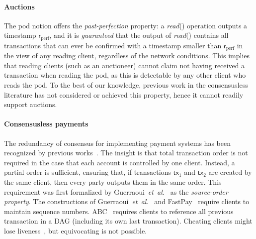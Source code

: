 \documentclass[pdflatex,sn-mathphys-num]{sn-jnl}%
\makeatletter
\theoremstyle{thmstyleone}%
\theoremstyle{thmstyletwo}%
\theoremstyle{thmstylethree}%
\newcommand{\podtm}{\textsf{pod}\xspace}
\newcommand{\op}[1]{\textsl{#1}}
\newcommand{\opread}[1]{\op{read}(#1)\xspace}
\newcommand{\operand}[1]{\textsf{#1}}
\newcommand{\tx}{\operand{tx}\xspace}
\newcommand{\round}{\operand{r}\xspace}
\newcommand{\rperf}{\ensuremath{\round_\text{perf}}\xspace}
\newcommand{\dotparagraph}[1]{\paragraph*{#1}}
\newcommand{\etal}{\textit{et~al.}\@}
\makeatother
\begin{document}
\dotparagraph{Auctions}
The \podtm notion offers the \emph{past-perfection} property:
a \opread{} operation outputs a timestamp \rperf, and it is \emph{guaranteed}
that the output of \opread{} contains all transactions that can ever be confirmed with a timestamp smaller than \rperf in the view of any reading client, regardless of the network conditions.
This implies that reading clients (such as an auctioneer) cannot claim not having received a transaction when reading the \podtm, as this is detectable by any other client who reads the \podtm.
To the best of our knowledge, previous work in the consensusless literature has not considered or achieved this property,
hence it cannot readily support auctions.

\dotparagraph{Consensusless payments}
The redundancy of consensus for implementing payment systems has been recognized by previous works~\cite{DBLP:journals/dc/GuerraouiKMPS22,DBLP:journals/corr/abs-1909-10926,DBLP:conf/dsn/CollinsGKKMPPST20,DBLP:conf/aft/BaudetDS20}.
The insight is that total transaction order is not required in the case that each account is controlled by one client.
Instead, a partial order is sufficient, ensuring that, if transactions $\tx_1$ and $\tx_2$ are created by the same client, then every party outputs them in the same order.
This requirement was first formalized by Guerraoui~\etal~\cite{DBLP:journals/dc/GuerraouiKMPS22} as the \emph{source-order property}.
The constructions of Guerraoui~\etal~\cite{DBLP:journals/dc/GuerraouiKMPS22} and FastPay~\cite{DBLP:conf/aft/BaudetDS20} require clients to maintain sequence numbers.
ABC~\cite{DBLP:journals/corr/abs-1909-10926} requires clients to reference all previous transaction in a DAG (including its own last transaction).
Cheating clients might lose liveness~\cite{DBLP:conf/aft/BaudetDS20,DBLP:journals/dc/GuerraouiKMPS22,DBLP:journals/corr/abs-1909-10926}, but equivocating is not possible.
\end{document}
